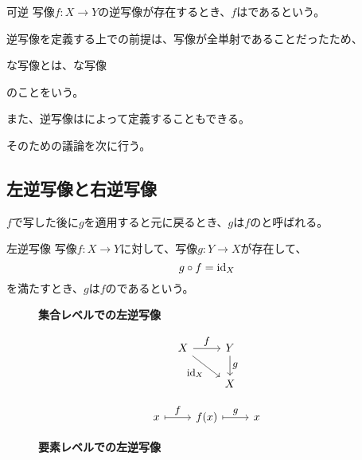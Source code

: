 \documentclass[../../../topic_linear-algebra]{subfiles}
\begin{document}
\begin{definition}{可逆}
  写像$f \colon X \to Y$の逆写像が存在するとき、$f$はであるという。
\end{definition}

逆写像を定義する上での前提は、写像が全単射であることだったため、
\begin{emphabox}
  \begin{spacebox}
    \begin{center}
      な写像とは、な写像
    \end{center}
  \end{spacebox}
\end{emphabox}
のことをいう。

\br

また、逆写像はによって定義することもできる。

そのための議論を次に行う。

\subsection{左逆写像と右逆写像}

$f$で写した後に$g$を適用すると元に戻るとき、$g$は$f$のと呼ばれる。

\begin{definition}{左逆写像}
  写像$f\colon X \to Y$に対して、写像$g\colon Y \to X$が存在して、
  \begin{equation*}
    g \circ f = \operatorname{id}_X
  \end{equation*}
  を満たすとき、$g$は$f$のであるという。
\end{definition}

\begin{figure}[h]
  \centering
  \begin{minipage}[t]{0.45\textwidth}
    \caption*{\bfseries 集合レベルでの左逆写像}
    \begin{equation*}
      \begin{tikzcd}[every label/.append style = {font = \small}]
        X \arrow[r, "f"] \arrow[dr, swap, "\id_X"] & Y \arrow[d, "g"] \\
        & X
      \end{tikzcd}
    \end{equation*}
  \end{minipage}
  \begin{minipage}[t]{0.45\textwidth}
    \caption*{\bfseries 要素レベルでの左逆写像}
    \begin{equation*}
      \begin{tikzcd}[every label/.append style = {font = \small}]
        x \arrow[r,mapsto, "f"] & f(x) \arrow[r,mapsto, "g"] & x
      \end{tikzcd}
    \end{equation*}
  \end{minipage}
\end{figure}
\end{document}
